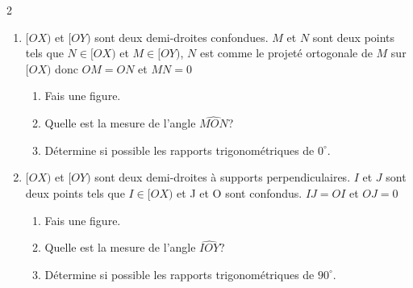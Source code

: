 \begin{multicols}{2}
   	\vspace{0.2cm}
  	\begin{enumerate}
  		\item $ [OX)  $ et $ [OY) $ sont deux demi-droites confondues. $ M $ et $ N $ sont deux points tels que $ N\in [OX)  $ et $ M\in [OY) $, $ N $ est comme le projeté ortogonale de $ M $ sur $ [OX) $ donc   $ OM=ON $ et $ MN=0 $
  		\begin{enumerate}
  			\item Fais une figure.
  			\item Quelle est la mesure de l'angle $ \widehat{MON} $?
  			\item Détermine si possible les rapports trigonométriques  de $ 0^\circ $.
  		\end{enumerate}
  		\item $ [OX)  $ et $ [OY) $ sont deux demi-droites à supports perpendiculaires. $ I $ et $ J $ sont deux points tels que $I\in [OX)  $ et J et O sont confondus. $ IJ=OI$ et $ OJ=0 $
  		\begin{enumerate}
  			\item Fais une figure.
  			\item Quelle est la mesure de l'angle $ \widehat{IOY} $?
  			\item Détermine si possible les rapports trigonométriques  de $ 90^\circ $.
  		\end{enumerate}
  	\end{enumerate}
  	\dures
  	

\end{multicols}
